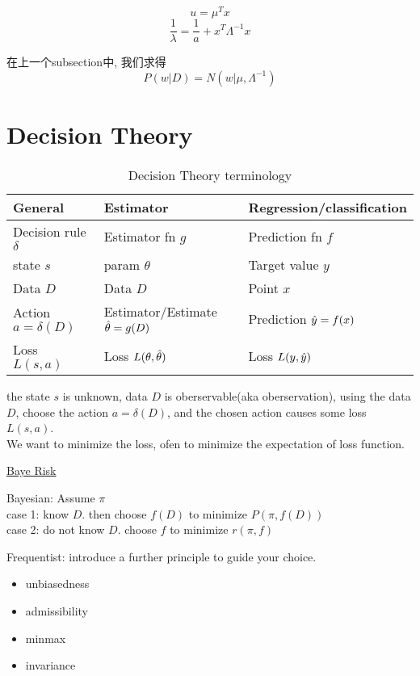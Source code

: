 \documentclass{article}
\begin{document}
$$u = \mu^T x$$
$$\dfrac{1}{\lambda} = \dfrac{1}{a} + x^T \Lambda^{-1} x$$

在上一个subsection中, 我们求得
$$P(w|D) = N(w| \mu, \Lambda^{-1})$$

\section{Decision Theory}
\begin{table}[h]
\caption{Decision Theory terminology}
\centering
\begin{tabular}{|l|l|l|}
\hline
\textbf{General}       & \textbf{Estimator}                            & \textbf{Regression/classification} \\ \hline
Decision rule $\delta$ & Estimator fn $g$                              & Prediction fn $f$                  \\ \hline
state $s$              & param $\theta$                                & Target value $y$                   \\ \hline
Data $D$               & Data $D$                                      & Point $x$                          \\ \hline
Action $a = \delta(D)$ & Estimator/Estimate $\hat{\theta} = g(D)$ & Prediction $\hat{y} = f(x)$   \\ \hline
Loss $L(s,a)$          & Loss $L(\theta, \hat{\theta})$           & Loss $L(y, \hat{y})$          \\ \hline
\end{tabular}
\end{table}

the state $s$ is unknown, data $D$ is oberservable(aka oberservation), 
using the data $D$, choose the action $a = \delta(D)$, and the chosen action causes some loss $L(s,a)$.\\
We want to minimize the loss, ofen to minimize the expectation of loss function.

\href{http://i.imgbox.com/fzqiKlAF.png}{Baye Risk}

Bayesian: Assume $\pi$\\
case 1: know $D$. then choose $f(D)$ to minimize $P(\pi, f(D))$\\
case 2: do not know $D$. choose $f$ to minimize $r(\pi, f)$

Frequentist: introduce a further principle to guide your choice.
\begin{itemize}
\item unbiasedness
\item admissibility
\item minmax
\item invariance
\end{itemize}
\end{document}
